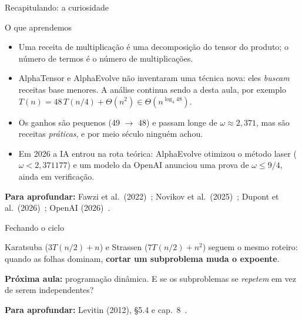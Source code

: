 \documentclass[aspectratio=169,xcolor=table]{beamer}
\newcommand{\fonte}[1]{%
  \vfill
  {\tiny\color{gray!55!black}\textbf{Para aprofundar:} #1\par}%
}
\begin{document}
\begin{frame}{Recapitulando: a curiosidade}
  \begin{block}{O que aprendemos}
    \begin{itemize}\scriptsize
      \item Uma receita de multiplicação é uma decomposição do tensor do produto; o número
            de termos é o número de multiplicações.
      \item AlphaTensor e AlphaEvolve não inventaram uma técnica nova: eles \emph{buscam}
            receitas base menores.
            A análise continua sendo a desta aula, por exemplo
            $T(n)=48\,T(n/4)+\Theta(n^2)\in\Theta(n^{\log_4 48})$.
      \item Os ganhos são pequenos (49 $\to$ 48) e passam longe de $\omega\approx 2{,}371$,
            mas são receitas \emph{práticas}, e por meio século ninguém achou.
      \item Em 2026 a IA entrou na rota teórica: AlphaEvolve otimizou o método laser
            ($\omega<2{,}371177$) e um modelo da OpenAI anunciou uma prova de
            $\omega\le 9/4$, ainda em verificação.
    \end{itemize}
  \end{block}
  \fonte{Fawzi et al.\ (2022)~\cite{fawzi2022discovering};
    Novikov et al.\ (2025)~\cite{novikov2025alphaevolve};
    Dupont et al.\ (2026)~\cite{dupont2026improving};
    OpenAI (2026)~\cite{openai2026ninefourths}.}
\end{frame}

\begin{frame}{Fechando o ciclo}
  \begin{center}
  \end{center}
  \medskip
  {\scriptsize
  Karatsuba ($3T(n/2)+n$) e Strassen ($7T(n/2)+n^2$) seguem o mesmo roteiro: quando as folhas
  dominam, \textbf{cortar um subproblema muda o expoente}.
  \smallskip

  \textbf{Próxima aula:} programação dinâmica. E se os subproblemas se \emph{repetem} em vez
  de serem independentes?}
  \fonte{Levitin (2012), \S 5.4 e cap.~8~\cite{levitin2012introduction}.}
\end{frame}
\end{document}
